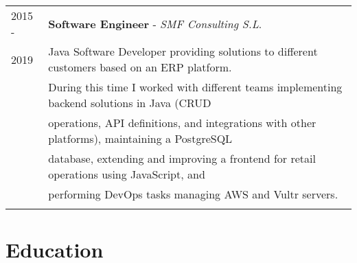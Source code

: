 \documentclass[a4paper,10pt]{article} %
\begin{document}
\begin{longtable}{ll}
2015 - & \textbf{Software Engineer} - \textit{SMF Consulting S.L}. \\ 
2019 & Java Software Developer providing solutions to different customers based on an ERP platform. \\ 
& During this time I worked with different teams implementing backend solutions in Java (CRUD \\ 
& operations, API definitions, and integrations with other platforms), maintaining a PostgreSQL \\
& database, extending and improving a frontend for retail operations using JavaScript, and  \\
& performing DevOps tasks managing AWS and Vultr servers. \\ & \\

\end{longtable}


\section{Education}
\end{document}

